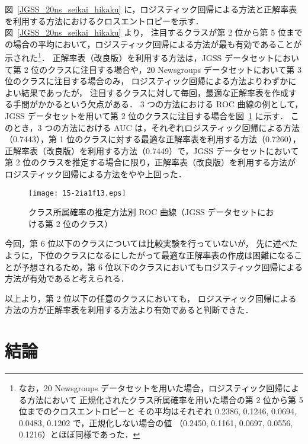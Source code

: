 \documentclass[japanese]{jnlp_1.4}
\begin{document}
図~\ref{JGSS_20ns_seikai_hikaku} に，ロジスティック回帰による方法と正解率表を利用する方法におけるクロスエントロピーを示す．
図~\ref{JGSS_20ns_seikai_hikaku} より，
注目するクラスが第 2 位から第 5 位までの場合の平均において，ロジスティック回帰による方法が最も有効であることが示された\footnote{
	なお，20 Newsgroups データセットを用いた場合，ロジスティック回帰による方法において
	正規化されたクラス所属確率を用いた場合の第 2 位から第 5 位までのクロスエントロピーと
	その平均はそれぞれ 0.2386, 0.1246, 0.0694, 0.0483, 0.1202 で，正規化しない場合の値
	（0.2450, 0.1161, 0.0697, 0.0556, 0.1216）とほぼ同様であった．
}．
正解率表（改良版）を利用する方法は，JGSS データセットにおいて第 2 位のクラスに注目する場合や，20 Newsgroups データセットにおいて第 3 位のクラスに注目する場合のみ，
ロジスティック回帰による方法よりわずかによい結果であったが，
注目するクラスに対して毎回，最適な正解率表を作成する手間がかかるという欠点がある． 
3 つの方法における ROC 曲線の例として，JGSS データセットを用いて第 2 位のクラスに注目する場合を図~\ref{ROC_JGSS_seikai_hikaku} に示す．
このとき，3 つの方法における AUC は，それぞれロジスティック回帰による方法（0.7443），第 1 位のクラスに対する最適な正解率表を利用する方法（0.7260），正解率表（改良版）を利用する方法（0.7449）で，JGSS データセットにおいて第 2 位のクラスを推定する場合に限り，正解率表（改良版）を利用する方法がロジスティック回帰による方法をやや上回った．

\begin{figure}[t]
  \begin{center}
\texttt{[image: 15-2ia1f13.eps]}
  \caption{クラス所属確率の推定方法別 ROC 曲線（JGSS データセットにおける第 2 位のクラス）}
  \label{ROC_JGSS_seikai_hikaku}
 \end{center}
\end{figure}


今回，第 6 位以下のクラスについては比較実験を行っていないが，
先に述べたように，下位のクラスになるにしたがって最適な正解率表の作成は困難になることが予想されるため，第 6 位以下のクラスにおいてもロジスティック回帰による方法が有効であると考えられる．


以上より，第 2 位以下の任意のクラスにおいても，
ロジスティック回帰による方法の方が正解率表を利用する方法より有効であると判断できた．

\section{結論}
\end{document}
